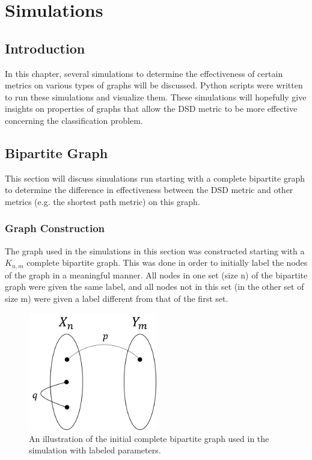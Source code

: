 \documentclass[12pt]{report}
\begin{document}
\chapter{Simulations}

\section{Introduction}
In this chapter, several simulations to determine the effectiveness of certain metrics on various types of graphs will be discussed. Python scripts were written to run these simulations and visualize them. These simulations will hopefully give insights on properties of graphs that allow the DSD metric to be more effective concerning the classification problem.

\section{Bipartite Graph}
This section will discuss simulations run starting with a complete bipartite graph to determine the difference in effectiveness between the DSD metric and other metrics (e.g. the shortest path metric) on this graph.

\subsection{Graph Construction}
The graph used in the simulations in this section was constructed starting with a $K_{n,m}$ complete bipartite graph. This was done in order to initially label the nodes of the graph in a meaningful manner. All nodes in one set (size n) of the bipartite graph were given the same label, and all nodes not in this set (in the other set of size m) were given a label different from that of the first set.\\

\begin{figure}[!ht]
\centering
\includegraphics[width=0.5\textwidth]{Simulation_Bipartite_Construction.png}
\caption{An illustration of the initial complete bipartite graph used in the simulation with labeled parameters.}
\label{fig:bip_construct}
\end{figure}
\end{document}
